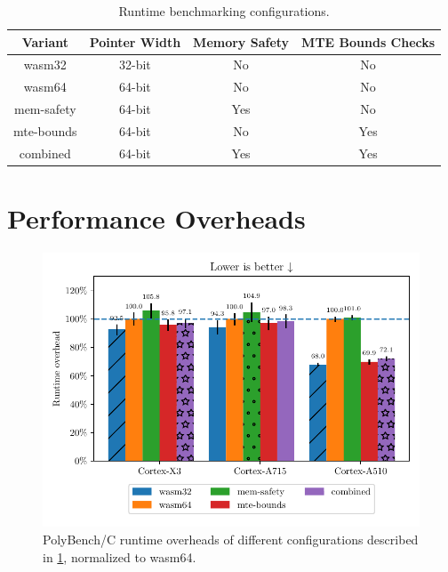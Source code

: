 \begin{table}[ht]
    \centering
    \small
    \caption{Runtime benchmarking configurations.}
    \label{tab:benchmark-variants}
    \begin{tabular}{c || c|c|c}
        \textbf{Variant} & \textbf{Pointer Width} & \textbf{Memory Safety} & \textbf{MTE Bounds Checks} \\
        \hline
        wasm32           & 32-bit                 & No                     & No                         \\
        wasm64           & 64-bit                 & No                     & No                         \\
        mem-safety       & 64-bit                 & Yes                    & No                         \\
        mte-bounds       & 64-bit                 & No                     & Yes                        \\
        combined         & 64-bit                 & Yes                    & Yes                        \\
    \end{tabular}
\end{table}


\section{Performance Overheads}
\label{sec:performance-overheads}

\begin{figure}[ht]
    \centering
    \includegraphics{plots/runtimes-all}
    \caption{PolyBench/C runtime overheads of different configurations described in \cref{tab:benchmark-variants}, normalized to wasm64.}
    \label{fig:runtime-overheads-combined}
\end{figure}

